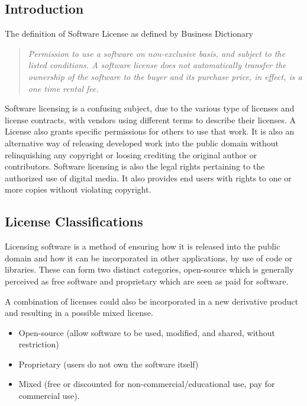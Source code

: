 \documentclass[12pt, onecolumn]{witseiepaper}
\begin{document}
\newpage

\subsection{Introduction}
The definition of Software License as defined by Business Dictionary \cite{bussdict}

\begin{quote}
	\textit{Permission to use a software on non-exclusive basis, and subject to the listed conditions. A software license does not automatically transfer the ownership of the software to the buyer and its purchase price, in effect, is a one time rental fee.}
\end{quote}

Software licensing is a confusing subject, due to the various type of licenses and license contracts, with vendors using different terms to describe their licenses.  A License also grants specific permissions for others to use that work.  It is also an alternative way of releasing developed work into the public domain without relinquishing any copyright or loosing crediting the original author or contributors.  Software licensing is also the legal rights pertaining to the authorized use of digital media.  It also provides end users with rights to one or more copies without violating copyright.

\subsection{License Classifications}

Licensing software is a method of ensuring how it is released into the public domain and how it can be incorporated in other applications, by use of code or libraries.  These can form two distinct categories, open-source which is generally perceived as free software and proprietary which are seen as paid for software.  

A combination of licenses could also be incorporated in a new derivative product and resulting in a possible mixed license.


\begin{itemize}
	\item Open-source (allow software to be used, modified, and shared, without restriction)
	\item Proprietary (users do not own the software itself)
	\item Mixed (free or discounted for non-commercial/educational use, pay for commercial use).
\end{itemize}
\end{document}
